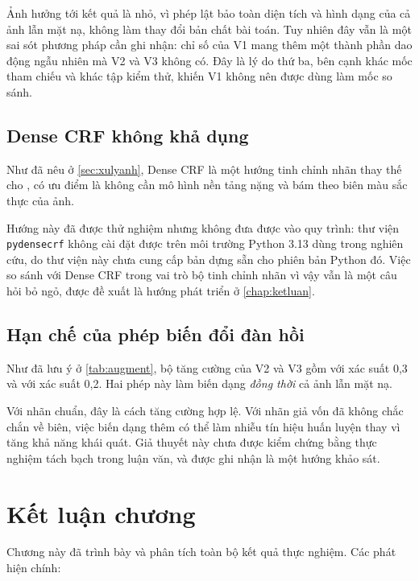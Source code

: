 Ảnh hưởng tới kết quả là nhỏ, vì phép lật bảo toàn diện tích và hình dạng của cả
ảnh lẫn mặt nạ, không làm thay đổi bản chất bài toán. Tuy nhiên đây vẫn là một sai
sót phương pháp cần ghi nhận: chỉ số của V1 mang thêm một thành phần dao động ngẫu
nhiên mà V2 và V3 không có. Đây là lý do thứ ba, bên cạnh khác mốc tham chiếu và
khác tập kiểm thử, khiến V1 không nên được dùng làm mốc so sánh.

\subsection{Dense CRF không khả dụng}

Như đã nêu ở \cref{sec:xulyanh}, Dense CRF là một hướng tinh chỉnh nhãn thay thế
cho \SAM{}, có ưu điểm là không cần mô hình nền tảng nặng và bám theo biên màu sắc
thực của ảnh.

Hướng này đã được thử nghiệm nhưng không đưa được vào quy trình: thư viện
\texttt{pydensecrf} không cài đặt được trên môi trường Python 3.13 dùng trong
nghiên cứu, do thư viện này chưa cung cấp bản dựng sẵn cho phiên bản Python đó.
Việc so sánh \SAM{} với Dense CRF trong vai trò bộ tinh chỉnh nhãn vì vậy vẫn là
một câu hỏi bỏ ngỏ, được đề xuất là hướng phát triển ở \cref{chap:ketluan}.

\subsection{Hạn chế của phép biến đổi đàn hồi}

Như đã lưu ý ở \cref{tab:augment}, bộ tăng cường của V2 và V3 gồm
 với xác suất 0,3 và  với xác suất 0,2.
Hai phép này làm biến dạng \emph{đồng thời} cả ảnh lẫn mặt nạ.

Với nhãn chuẩn, đây là cách tăng cường hợp lệ. Với nhãn giả vốn đã không chắc chắn
về biên, việc biến dạng thêm có thể làm nhiễu tín hiệu huấn luyện thay vì tăng khả
năng khái quát. Giả thuyết này chưa được kiểm chứng bằng thực nghiệm tách bạch
trong luận văn, và được ghi nhận là một hướng khảo sát.

\section{Kết luận chương}

Chương này đã trình bày và phân tích toàn bộ kết quả thực nghiệm. Các phát hiện
chính:

